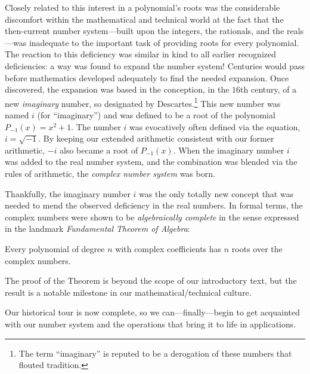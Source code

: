 Closely related to this interest in a polynomial's roots was the
considerable discomfort within the mathematical and technical world at
the fact that the then-current number system---built upon the
integers, the rationals, and the reals---was inadequate to the
important task of providing roots for every polynomial.  The reaction
to this deficiency was similar in kind to all earlier recognized
deficiencies: a way was found to expand the number system!  Centuries
would pass before mathematics developed adequately to find the needed
expansion.  Once discovered, the expansion was based in the
conception, in the $16$th century, of a new {\it imaginary} number,
 so designated by 
Descartes.\footnote{The term ``imaginary'' is reputed to be a
  derogation of these numbers that flouted tradition.}  This new
number was named $i$ 
 (for ``imaginary'') and was defined to
be a root of the polynomial $P_{-1}(x) = x^2 +1$.  The number $i$ was
evocatively often defined via the equation, $i = \sqrt{-1}$.  By
keeping our extended arithmetic consistent with our former arithmetic,
$-i$ also became a root of $P_{-1}(x)$.  When the imaginary number $i$
was added to the real number system, and the combination was blended
via the rules of arithmetic, the {\it complex number
  system} was born.

Thankfully, the imaginary number $i$ was the only totally new concept
that was needed to mend the observed deficiency in the real numbers.
In formal terms, the complex numbers were shown to be {\it
  algebraically complete}  in the sense expressed in the landmark {\it Fundamental
  Theorem of Algebra}: 

\begin{theorem}
Every polynomial of degree $n$ with complex coefficients has $n$ roots
over the complex numbers.
\end{theorem}

The proof of the Theorem is beyond the scope of our introductory text,
but the result is a notable milestone in our mathematical/technical
culture.

\medskip

Our historical tour is now complete, so we can---finally---begin to
get acquainted with our number system and the operations that bring it
to life in applications.

